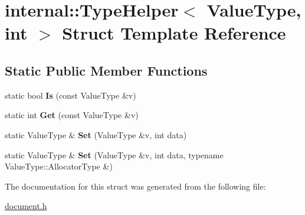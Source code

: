 \hypertarget{a00315}{}\section{internal\+:\+:Type\+Helper$<$ Value\+Type, int $>$ Struct Template Reference}
\label{a00315}
\subsection*{Static Public Member Functions}
\begin{DoxyCompactItemize}
\item 
static bool {\bfseries Is} (const Value\+Type \&v)\hypertarget{a00315_aa17ef940501aac12fd7934ef979c607e}{}\label{a00315_aa17ef940501aac12fd7934ef979c607e}

\item 
static int {\bfseries Get} (const Value\+Type \&v)\hypertarget{a00315_a98c331ac026873b9ad4ba68e7bf28446}{}\label{a00315_a98c331ac026873b9ad4ba68e7bf28446}

\item 
static Value\+Type \& {\bfseries Set} (Value\+Type \&v, int data)\hypertarget{a00315_aceea0a0fac6684e53a9d9f66da4154cd}{}\label{a00315_aceea0a0fac6684e53a9d9f66da4154cd}

\item 
static Value\+Type \& {\bfseries Set} (Value\+Type \&v, int data, typename Value\+Type\+::\+Allocator\+Type \&)\hypertarget{a00315_a2ca21bedcaeaf0fffe913edb2fe1a66a}{}\label{a00315_a2ca21bedcaeaf0fffe913edb2fe1a66a}

\end{DoxyCompactItemize}


The documentation for this struct was generated from the following file\+:\begin{DoxyCompactItemize}
\item 
\hyperlink{a00473}{document.\+h}\end{DoxyCompactItemize}
